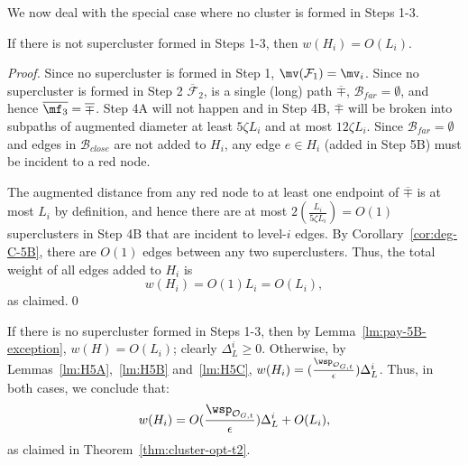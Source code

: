 We now  deal with the special case where no cluster is formed in Steps 1-3.
\begin{lemma}\label{lm:pay-5B-exception}  If there is not supercluster formed in Steps 1-3, then $w(H_i) = O(L_i)$.
\end{lemma}
\begin{proof} Since no supercluster is formed in Step 1, $\mv(\mathcal{F}_1) = \mv_i$.
	Since no supercluster is formed in Step 2  $\overline{\mathcal{F}}_2$, 
	  is a  single (long) path $\overline{\mp}$, $\mathcal{B}_{far} = \emptyset$, and hence $\overline{\mf_3} = \overline{\mp}$. Step 4A will not happen and in Step 4B, $\overline{\mp}$ will be broken into subpaths of augmented diameter at least $5\zeta L_i$ and at most $12\zeta L_i$. Since $\mathcal{B}_{far} = \emptyset$ and edges in $\mathcal{B}_{close}$ are not added to $H_i$, any edge $e\in H_i$ (added in Step 5B) must be incident to a red node.  
	
	The augmented distance from any red node to at least one endpoint of $\overline{\mp}$ is at most $L_i$ by definition, and hence there are at most $2(\frac{L_i}{5\zeta  L_i}) = O(1)$ superclusters in Step 4B that are incident to level-$i$ edges. By  Corollary~\ref{cor:deg-C-5B}, there are $O(1)$ edges between any two superclusters. Thus, the total  weight of all edges added to $H_i$ is
	\begin{equation*}
	w(H_i) = O(1) L_i = O(L_i),
	\end{equation*}
	as claimed.\qed
\end{proof}

If there is no supercluster formed in Steps 1-3, then by Lemma~\ref{lm:pay-5B-exception}, $w(H) = O(L_i)$; clearly $\Delta^i_{L}\geq 0$. Otherwise, by Lemmas~\ref{lm:H5A},~\ref{lm:H5B} and~\ref{lm:H5C}, $w(H_i) =  (\frac{\wsp_{\mathcal{O}_{G,t}}}{\epsilon})\Delta^i_{L}$. Thus, in both cases, we conclude that:
\begin{equation*}
w(H_i) = O(\frac{\wsp_{\mathcal{O}_{G,t}}}{\epsilon})\Delta^i_{L} + O(L_i),
\end{equation*}
as claimed in Theorem~\ref{thm:cluster-opt-t2}.
